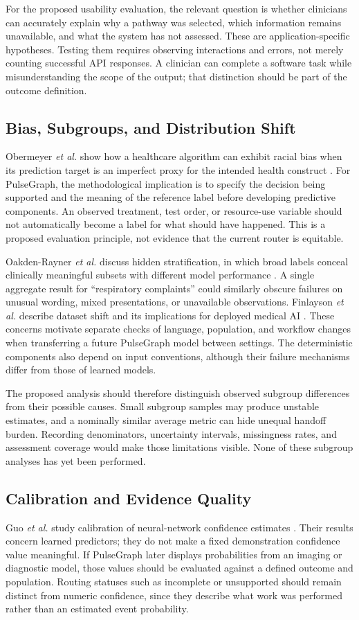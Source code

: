 \documentclass[conference]{IEEEtran}
\begin{document}
For the proposed usability evaluation, the relevant question is whether clinicians can accurately explain why a pathway was selected, which information remains unavailable, and what the system has not assessed. These are application-specific hypotheses. Testing them requires observing interactions and errors, not merely counting successful API responses. A clinician can complete a software task while misunderstanding the scope of the output; that distinction should be part of the outcome definition.

\subsection{Bias, Subgroups, and Distribution Shift}
Obermeyer \emph{et al.} show how a healthcare algorithm can exhibit racial bias when its prediction target is an imperfect proxy for the intended health construct \cite{obermeyer}. For PulseGraph, the methodological implication is to specify the decision being supported and the meaning of the reference label before developing predictive components. An observed treatment, test order, or resource-use variable should not automatically become a label for what should have happened. This is a proposed evaluation principle, not evidence that the current router is equitable.

Oakden-Rayner \emph{et al.} discuss hidden stratification, in which broad labels conceal clinically meaningful subsets with different model performance \cite{hidden}. A single aggregate result for ``respiratory complaints'' could similarly obscure failures on unusual wording, mixed presentations, or unavailable observations. Finlayson \emph{et al.} describe dataset shift and its implications for deployed medical AI \cite{shift}. These concerns motivate separate checks of language, population, and workflow changes when transferring a future PulseGraph model between settings. The deterministic components also depend on input conventions, although their failure mechanisms differ from those of learned models.

The proposed analysis should therefore distinguish observed subgroup differences from their possible causes. Small subgroup samples may produce unstable estimates, and a nominally similar average metric can hide unequal handoff burden. Recording denominators, uncertainty intervals, missingness rates, and assessment coverage would make those limitations visible. None of these subgroup analyses has yet been performed.

\subsection{Calibration and Evidence Quality}
Guo \emph{et al.} study calibration of neural-network confidence estimates \cite{calibration}. Their results concern learned predictors; they do not make a fixed demonstration confidence value meaningful. If PulseGraph later displays probabilities from an imaging or diagnostic model, those values should be evaluated against a defined outcome and population. Routing statuses such as incomplete or unsupported should remain distinct from numeric confidence, since they describe what work was performed rather than an estimated event probability.
\end{document}

